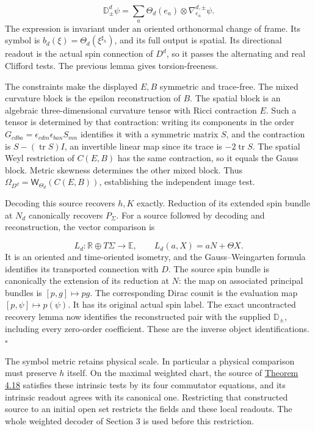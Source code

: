 \documentclass[
  english,
  11pt,
  reqno]{amsart}
\begin{document}
\label{eq:online-intrinsic-constructor-gradients} \[
\mathbb D_\pm^d\psi
=\sum_a\Theta_d(e_a)\otimes\nabla^{d,\pm}_{e_a}\psi.
\] The expression is invariant under an oriented orthonormal change of
frame. Its symbol is \(b_d(\xi)=\Theta_d(\xi^{\sharp_h})\), and its full
output is spatial. Its directional readout is the actual spin connection
of \(D^d\), so it passes the alternating and real Clifford tests. The
previous lemma gives torsion-freeness.

The constraints make the displayed \(E,B\) symmetric and trace-free. The
mixed curvature block is the epsilon reconstruction of \(B\). The
spatial block is an algebraic three-dimensional curvature tensor with
Ricci contraction \(E\). Such a tensor is determined by that
contraction: writing its components in the order
\(G_{cdba}=\epsilon_{cdm}\epsilon_{ban}S_{mn}\) identifies it with a
symmetric matrix \(S\), and the contraction is
\(S-(\operatorname{tr}S)I\), an invertible linear map since its trace is
\(-2\operatorname{tr}S\). The spatial Weyl restriction of \(C(E,B)\) has
the same contraction, so it equals the Gauss block. Metric skewness
determines the other mixed block. Thus
\(\Omega_{D^d}=\mathsf W_{\Theta_d}(C(E,B))\), establishing the
independent image test.

Decoding this source recovers \(h,K\) exactly. Reduction of its extended
spin bundle at \(N_d\) canonically recovers \(P_\Sigma\). For a source
followed by decoding and reconstruction, the vector comparison is

\label{eq:online-intrinsic-source-counit} \[
L_d:\mathbb R\oplus T\Sigma\longrightarrow\mathbb E,
\qquad L_d(a,X)=aN+\Theta X.
\] It is an oriented and time-oriented isometry, and the
Gauss--Weingarten formula identifies its transported connection with
\(D\). The source spin bundle is canonically the extension of its
reduction at \(N\): the map on associated principal bundles is
\([p,g]\mapsto p g\). The corresponding Dirac counit is the evaluation
map \([p,\psi]\mapsto p(\psi)\). It has its original actual spin label.
The exact uncontracted recovery lemma now identifies the reconstructed
pair with the supplied \(\mathbb D_\pm\), including every zero-order
coefficient. These are the inverse object identifications.
\hfill\(\square\)

The symbol metric retains physical scale. In particular a physical
comparison must preserve \(h\) itself. On the maximal weighted chart,
the source of
\hyperref[thm:online-ordinary-negative-response-initial-source]{Theorem
4.18} satisfies these intrinsic tests by its four commutator equations,
and its intrinsic readout agrees with its canonical one. Restricting
that constructed source to an initial open set restricts the fields and
these local readouts. The whole weighted decoder of Section 3 is used
before this restriction.
\end{document}

